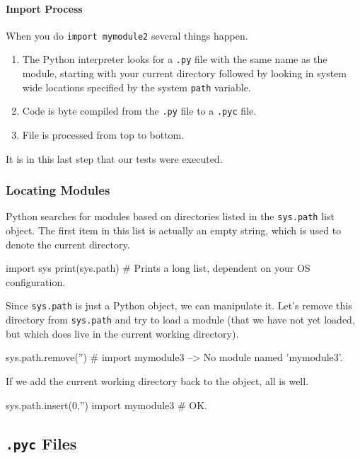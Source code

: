 \documentclass[12pt,letterpaper,twoside]{article}
\begin{document}
\paragraph{Import Process} 
When you do \texttt{import mymodule2} several things happen.

\begin{enumerate}
\def\labelenumi{\arabic{enumi}.}
\item
  The Python interpreter looks for a \texttt{.py} file with the same name as
  the module, starting with your current directory followed by looking
  in system wide locations specified by the system \texttt{path} variable.
\item
  Code is byte compiled from the \texttt{.py} file to a \texttt{.pyc}
  file.
\item
  File is processed from top to bottom.
\end{enumerate}

It is in this last step that our tests were executed.

\subsubsection{Locating Modules}
Python searches for modules based on directories listed in the 
\texttt{sys.path} list object. The first item in this list is actually an empty string,
which is used to denote the current directory.

\begin{python}
import sys
print(sys.path)   # Prints a long list, dependent on your OS configuration. 
\end{python}

Since \texttt{sys.path} is just a Python object, we can manipulate it.
Let's remove this directory from \texttt{sys.path} and try to load a
module (that we have not yet loaded, but which does live in the current working directory).

\begin{python}
sys.path.remove('')
# import mymodule3  --> No module named 'mymodule3'.
\end{python}

If we add the current working directory back to the object, all is well.

\begin{python}
sys.path.insert(0,'')
import mymodule3   # OK.
\end{python}

\subsection{\texttt{.pyc} Files}
\end{document}
